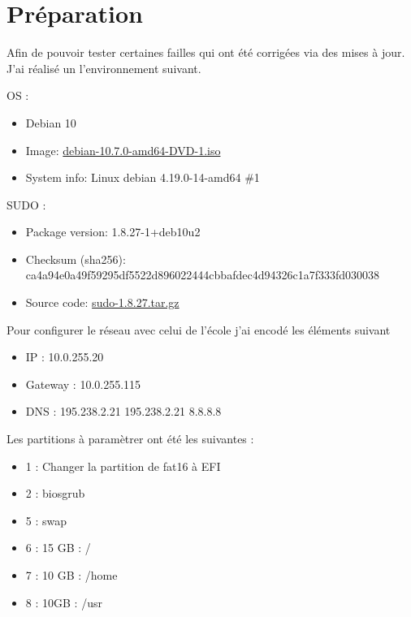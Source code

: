 \documentclass[a4paper, 12pt]{article}
\begin{document}
   \section{Préparation}
   \begin{flushleft}
       \noindent Afin de pouvoir tester certaines failles qui ont été corrigées via des mises à jour. J'ai réalisé un l'environnement suivant. 
       \item OS : 
       \begin{itemize}
           \item  Debian 10
           \item Image: \href{https://cdimage.debian.org/mirror/cdimage/archive/10.7.0/amd64/iso-dvd/debian-10.7.0-amd64-DVD-1.iso}{debian-10.7.0-amd64-DVD-1.iso } \cite{CVE2021350:online}
           \item System info: Linux debian 4.19.0-14-amd64 \#1
       \end{itemize}
       \item SUDO : 
       \begin{itemize}
           \item Package version: 1.8.27-1+deb10u2
           \item Checksum (sha256): ca4a94e0a49f59295df5522d896022444cbbafdec4d94326c1a7f333fd030038
           \item Source code: \href{https://www.sudo.ws/dist/sudo-1.8.27.tar.gz}{sudo-1.8.27.tar.gz} \cite{CVE2021350:online}
       \end{itemize}
       \item Pour configurer le réseau avec celui de l'école j'ai encodé les éléments suivant
       \begin{itemize}
           \item IP : 10.0.255.20
           \item Gateway : 10.0.255.115
           \item DNS : 195.238.2.21 195.238.2.21 8.8.8.8
       \end{itemize}
       \item Les partitions à paramètrer ont été les suivantes : 
       \begin{itemize}
           \item 1 : Changer la partition de fat16 à EFI
           \item 2 : biosgrub
           \item 5 : swap
           \item 6 : 15 GB : / 
           \item 7 : 10 GB : /home
           \item 8 : 10GB : /usr 
       \end{itemize}


\end{flushleft}
\end{document}
